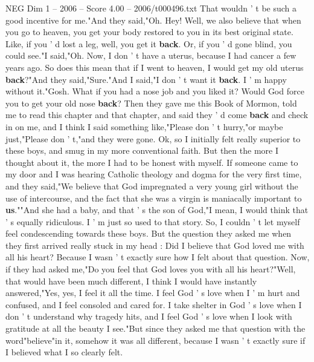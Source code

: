 \begin{textsample}{NEG Dim 1 – 2006 – Score 4.00 – 2006/t000496.txt}
That wouldn ' t be such a good incentive for me."And they said,"Oh.
Hey!
Well, we also believe that when you go to heaven, you get your body restored to you in its best original state.
Like, if you ' d lost a leg, well, you get it \textbf{back}.
Or, if you ' d gone blind, you could see."I said,"Oh.
Now, I don ' t have a uterus, because I had cancer a few years ago.
So does this mean that if I went to heaven, I would get my old uterus \textbf{back}?"And they said,"Sure."And I said,"I don ' t want it \textbf{back}.
I ' m happy without it."Gosh.
What if you had a nose job and you liked it?
Would God force you to get your old nose \textbf{back}?
Then they gave me this Book of Mormon, told me to read this chapter and that chapter, and said they ' d come \textbf{back} and check in on me, and I think I said something like,"Please don ' t hurry,"or maybe just,"Please don ' t,"and they were gone.
Ok, so I initially felt really superior to these boys, and smug in my more conventional faith.
But then the more I thought about it, the more I had to be honest with myself.
If someone came to my door and I was hearing Catholic theology and dogma for the very first time, and they said,"We believe that God impregnated a very young girl without the use of intercourse, and the fact that she was a virgin is maniacally important to \textbf{us}.""And she had a baby, and that ' s the son of God,"I mean, I would think that ' s equally ridiculous.
I ' m just so used to that story.
So, I couldn ' t let myself feel condescending towards these boys.
But the question they asked me when they first arrived really stuck in my head : Did I believe that God loved me with all his heart?
Because I wasn ' t exactly sure how I felt about that question.
Now, if they had asked me,"Do you feel that God loves you with all his heart?"Well, that would have been much different, I think I would have instantly answered,"Yes, yes, I feel it all the time.
I feel God ' s love when I ' m hurt and confused, and I feel consoled and cared for.
I take shelter in God ' s love when I don ' t understand why tragedy hits, and I feel God ' s love when I look with gratitude at all the beauty I see."But since they asked me that question with the word"believe"in it, somehow it was all different, because I wasn ' t exactly sure if I believed what I so clearly felt.

\end{textsample}

